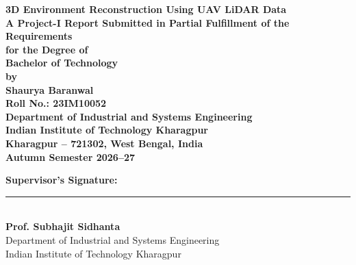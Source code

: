 \documentclass[11pt,a4paper]{report}
\begin{document}
\begin{titlepage}
    \begin{center}
        \vspace*{5mm}
        {\LARGE \textbf{3D Environment Reconstruction Using UAV LiDAR Data}}\\[8mm]
        {\large \textbf{A Project-I Report Submitted in Partial Fulfillment of the Requirements\\for the Degree of}}\\[4mm]
        {\large \textbf{Bachelor of Technology}}\\[15mm]

        {\large \textbf{by}}\\[4mm]
        {\Large \textbf{Shaurya Baranwal}}\\[2mm]
        {\large \textbf{Roll No.: 23IM10052}}\\[25mm]

        {\large \textbf{Department of Industrial and Systems Engineering}}\\[2mm]
        {\Large \textbf{Indian Institute of Technology Kharagpur}}\\[2mm]
        {\large \textbf{Kharagpur -- 721302, West Bengal, India}}\\[8mm]
        {\large \textbf{Autumn Semester 2026--27}}\\[30mm]
    \end{center}

    \vfill
    \begin{flushright}
        \begin{minipage}{0.45\textwidth}
            \centering
            \textbf{Supervisor's Signature:}\\[15mm]
            \rule{60mm}{0.4pt}\\[2mm]
            \textbf{Prof. Subhajit Sidhanta}\\
            Department of Industrial and Systems Engineering\\
            Indian Institute of Technology Kharagpur
        \end{minipage}
    \end{flushright}
    \vspace{10mm}
\end{titlepage}

\setcounter{page}{2}
\end{document}
